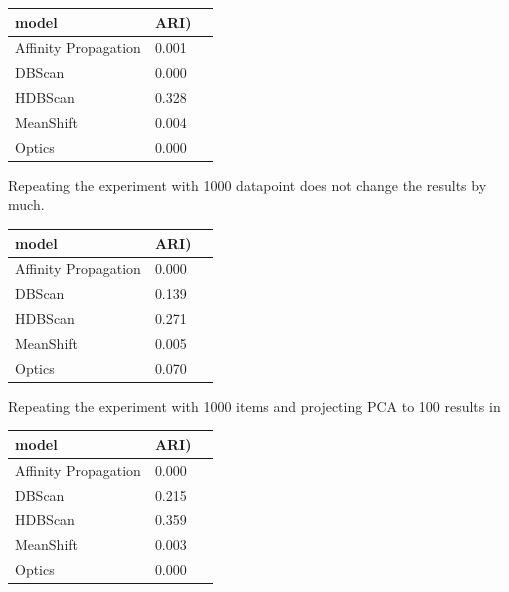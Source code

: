 \documentclass[a4paper,12pt,twoside,openright]{report}
\begin{document}
\newcolumntype{b}{X}

\begin{table}[htbp]
    \centering
    \begin{tabularx}{\textwidth}{b|ss}
    \toprule
      {model} & {ARI)}  \\ \hline
        Affinity Propagation     & 0.001     \\ \hline
        DBScan                        & 0.000      \\ \hline
        HDBScan                      & 0.328     \\ \hline
        MeanShift                    & 0.004      \\ \hline
        Optics                         & 0.000      \\ \hline
    \end{tabularx}
\end{table}

Repeating the experiment with 1000 datapoint does not change the results by much.

\begin{table}[htbp]
    \centering
    \begin{tabularx}{\textwidth}{b|ss}
    \toprule
      {model} & {ARI)}  \\ \hline
        Affinity Propagation     & 0.000     \\ \hline
        DBScan                        & 0.139      \\ \hline
        HDBScan                      & 0.271     \\ \hline
        MeanShift                    & 0.005      \\ \hline
        Optics                         & 0.070      \\ \hline
    \end{tabularx}
\end{table}

Repeating the experiment with 1000 items and projecting PCA to 100 results in 

\begin{table}[htbp]
    \centering
    \begin{tabularx}{\textwidth}{b|ss}
    \toprule
      {model} & {ARI)}  \\ \hline
        Affinity Propagation     & 0.000     \\ \hline
        DBScan                        & 0.215      \\ \hline
        HDBScan                      & 0.359     \\ \hline
        MeanShift                    & 0.003      \\ \hline
        Optics                         & 0.000      \\ \hline
    \end{tabularx}
\end{table}
\end{document}
